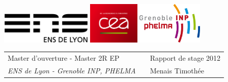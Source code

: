 \documentclass[a4paper,11pt]{article}
\begin{document}
\setlength{\parindent}{0pt}

\thispagestyle{empty}

\includegraphics[height=1.5cm]{ens.png} \hfill \includegraphics[height=2cm]{cea2.png} \hfill \includegraphics[height=2cm]{phelma.jpg}

\vspace{0.5cm}

\begin{tabularx}{\textwidth}{@{} l X l @{} }
{\sc Master d'ouverture - Master  2R EP} & & Rapport de stage 2012 \\
{\it ENS de Lyon - Grenoble INP, PHELMA} & & Menais Timothée \\

\end{tabularx}
\end{document}
